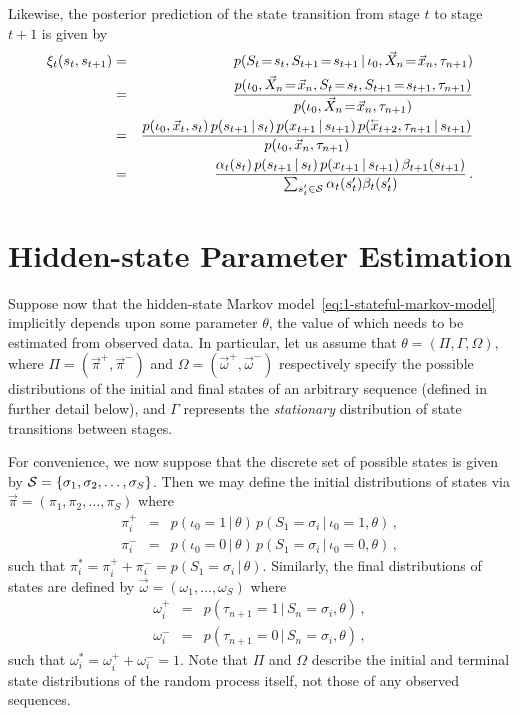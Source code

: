 \documentclass[a4paper]{article}
\newcommand{\rvec}[1]{\accentset{\leftarrow}{#1}}
\begin{document}
Likewise, the posterior prediction of the state transition from stage $t$ to stage $t+1$ is given by
\begin{eqnarray}
\xi_t(s_t,s_{t+1}) & = &
   p(S_t\!=\!s_t,S_{t+1}\!=\!s_{t+1}\,|\,\iota_0,\vec{X}_n\!=\!\vec{x}_n,\tau_{n+1})
\nonumber\\& = & 
\frac{p(\iota_0,\vec{X}_n\!=\!\vec{x}_n,S_t\!=\!s_t,S_{t+1}\!=\!s_{t+1},\tau_{n+1})}
        {p(\iota_0,\vec{X}_n\!=\!\vec{x}_n,\tau_{n+1})}
\nonumber\\& = & 
\frac{p(\iota_0,\vec{x}_t,s_t)\,p(s_{t+1}\,|\,s_t)\,p(x_{t+1}\,|\,s_{t+1})\,p(\rvec{x}_{t+2},\tau_{n+1}\,|\,s_{t+1})}
        {p(\iota_0,\vec{x}_n,\tau_{n+1})}
\nonumber\\& = & 
\frac{\alpha_t(s_t)\,p(s_{t+1}\,|\,s_t)\,p(x_{t+1}\,|\,s_{t+1})\,\beta_{t+1}(s_{t+1})}
        {\sum_{s_t'\in{\cal S}}\alpha_t(s_t')\beta_t(s_t')}
\,.
\label{eq:xi-def}
\end{eqnarray}

\section{Hidden-state Parameter Estimation}

Suppose now that the hidden-state Markov model~\eqref{eq:1-stateful-markov-model} implicitly depends upon some
parameter $\theta$, the value of which needs to be estimated from observed data.
In particular, let us assume that $\theta=(\Pi,\Gamma,\Omega)$,
where $\Pi=(\vec{\pi}^+,\vec{\pi}^-)$ 
and $\Omega=(\vec{\omega}^+,\vec{\omega}^-)$ respectively
specify the possible distributions of the initial and final
states of an arbitrary sequence (defined in further detail below),
and $\Gamma$ represents the {\em stationary} distribution of state transitions between stages.

For convenience, we now suppose that the discrete set of possible states is given by
${\cal S}=\{\sigma_1,\sigma_2,\ldots,\sigma_S\}$.
Then we may define the initial distributions of states via $\vec{\pi}=(\pi_{1},\pi_{2},\ldots,\pi_{S})$ where
\begin{eqnarray}
  \pi_{i}^+ & = & p(\iota_0\!=\!1\,|\,\theta)\,p(S_1\!=\!\sigma_i\,|\,\iota_0\!=\!1,\theta)\,,
\\
  \pi_{i}^- & = & p(\iota_0\!=\!0\,|\,\theta)\,p(S_1\!=\!\sigma_i\,|\,\iota_0\!=\!0,\theta)\,,
\end{eqnarray}
such that $\pi_{i}^*=\pi_i^{+}+\pi_i^{-}=p(S_1\!=\!\sigma_i\,|\,\theta)$.
Similarly, the final distributions of states are defined by $\vec{\omega}=(\omega_1,\ldots,\omega_S)$ where
\begin{eqnarray}
  \omega_{i}^+ & = & p(\tau_{n+1}=1\,|\,S_n\!=\!\sigma_i,\theta)\,,
\\
  \omega_{i}^- & = & p(\tau_{n+1}=0\,|\,S_n\!=\!\sigma_i,\theta)\,,
\end{eqnarray}
such that $\omega_{i}^*=\omega_i^{+}+\omega_i^{-}=1$.
Note that $\Pi$ and $\Omega$ describe the initial and terminal state distributions of the random process itself, not those of any observed sequences.
\end{document}
